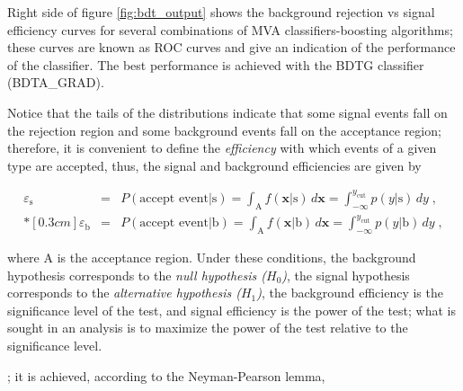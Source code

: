 Right side of figure \ref{fig:bdt_output} shows the background rejection vs signal efficiency curves for several combinations of MVA classifiers-boosting algorithms; these curves are known as ROC curves and give an indication of the performance of the classifier. The best performance is achieved with the BDTG classifier (BDTA\_GRAD).   























 Notice that the tails of the distributions indicate that some signal events fall on the rejection region and some background events fall on the acceptance region; therefore, it is convenient to define the \textit{efficiency} with which events of a given type are accepted, thus, the signal and background efficiencies are given by 

\begin{eqnarray}
\label{eq:sigeff}
\varepsilon_{\textrm{s}} & = & P( \mbox{accept event} | \mbox{s} ) = \int_{\textrm{A}} f(\textbf{x} | \mbox{s} ) \, d \textbf{x} = \int_{-\infty}^{y_{\textrm{cut}}} p(y | \mbox{s}) \, dy\;, \\*[0.3 cm]
\varepsilon_{\textrm{b}} & = & P( \mbox{accept event} | \mbox{b} ) = \int_{\textrm{A}} f(\textbf{x} | \mbox{b} ) \, d \textbf{x} = \int_{-\infty}^{y_{\textrm{cut}}} p(y | \mbox{b}) \, dy \;,
\end{eqnarray}

where A is the acceptance region. Under these conditions, the background hypothesis corresponds to the \textit{null hypothesis ($H_0$)}, the signal hypothesis corresponds to the \textit{alternative hypothesis ($H_1$)}, the background efficiency is the significance level of the test, and signal efficiency is the power of the test; what is sought in an analysis is to maximize the power of the test relative to the significance level.








; it is achieved, according to the Neyman-Pearson lemma\cite{npl},







